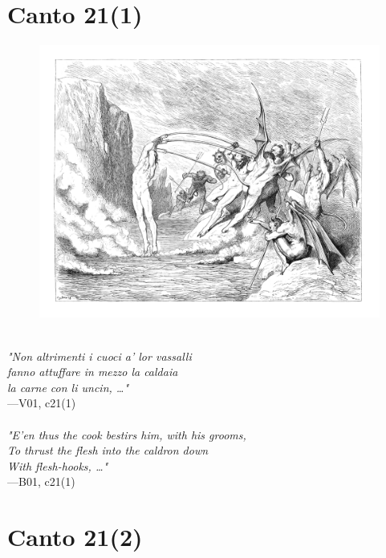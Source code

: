 \documentclass[../Dore_vision.tex]{subfiles}
\begin{document}
\newpage

\section{Canto 21(1)}

\begin{figure}[ht]
\centering
\includegraphics[height=\figsize]{illustrations/book_1/V01, c21(1).jpg}
\end{figure}

\begin{center}
\begin{minipage}{0.8\linewidth}
\textit{\\
"Non altrimenti i cuoci a’ lor vassalli\\fanno attuffare in mezzo la caldaia\\la carne con li uncin, …"} \\
—V01, c21(1) \\~\\
\textit{"E'en thus the cook bestirs him, with his grooms,\\To thrust the flesh into the caldron down\\With flesh-hooks, …"} \\
—B01, c21(1)
\end{minipage}
\end{center}

\newpage

\section{Canto 21(2)}
\end{document}
